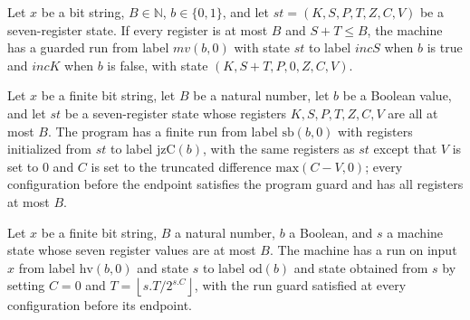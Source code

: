 \begin{theorem}
\label{Complexity.LogProg.TQBFARM.mv_run}
\leanok
{}
Let $x$ be a bit string, $B\in\mathbb{N}$, $b\in\{0,1\}$, and let $st=(K,S,P,T,Z,C,V)$
be a seven-register state. If every register is at most $B$ and $S+T\leq B$, the machine
has a guarded run from label $mv(b,0)$ with state $st$ to label $incS$ when $b$ is true
and $incK$ when $b$ is false, with state $(K,S+T,P,0,Z,C,V)$.
\end{theorem}

\begin{theorem}
\label{Complexity.LogProg.TQBFARM.sb_run}
\leanok
{}
Let $x$ be a finite bit string, let $B$ be a natural number, let $b$ be a Boolean value,
and let $st$ be a seven-register state whose registers $K,S,P,T,Z,C,V$ are all at most
$B$. The program has a finite run from label $\text{sb}(b,0)$ with registers initialized
from $st$ to label $\text{jzC}(b)$, with the same registers as $st$ except that $V$ is
set to $0$ and $C$ is set to the truncated difference $\text{max}(C-V,0)$; every
configuration before the endpoint satisfies the program guard and has all registers at
most $B$.
\end{theorem}

\begin{theorem}
\label{Complexity.LogProg.TQBFARM.hv_run}
\leanok
{}
Let $x$ be a finite bit string, $B$ a natural number, $b$ a Boolean, and $s$ a machine
state whose seven register values are at most $B$. The machine has a run on input $x$
from label $\text{hv}(b,0)$ and state $s$ to label $\text{od}(b)$ and state obtained from
$s$ by setting $C=0$ and $T=\left\lfloor s.T/2^{s.C}\right\rfloor$, with the run guard
satisfied at every configuration before its endpoint.
\end{theorem}
